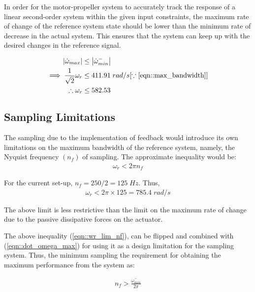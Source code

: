 
In order for the motor-propeller system to accurately track the response of a linear second-order system within the given input constraints, the maximum rate of change of the reference system state should be lower than the minimum rate of decrease in the actual system. This ensures that the system can keep up with the desired changes in the reference signal.

\begin{align}
    \left\lvert \dot \omega_{max} \right\rvert &\leq \left\lvert \dot \omega^{-}_{min} \right\rvert \label{eqn::dot_omega_max}\\
    \implies \frac{1}{\sqrt{2}} \omega_r &\leq 411.91 \; rad/s
    [\because \ref{eqn::max_bandwidth}]\\
    \therefore \omega_r &\leq 582.53
    \label{eqn::omega_r_lim}
\end{align}


\subsection{Sampling Limitations}
The sampling due to the implementation of feedback would introduce its own
limitations on the maximum bandwidth of the reference system, namely, the
Nyquist frequency $(n_f)$ of sampling. The approximate inequality would be:
\begin{align}
    \omega_r < 2 \pi n_f
    \label{eqn::wr_lim_nf}
\end{align}

For the current set-up, $n_f = 250/2 = 125 \; Hz$. Thus,
\begin{align}
    \omega_r < 2\pi \times 125 = 785.4 \; rad/s
\end{align}

The above limit is less restrictive than the limit on the maximum rate of change
due to the passive dissipative forces on the actuator.


\bigskip {} The above inequality (\ref{eqn::wr_lim_nf}), can be
flipped and combined with (\ref{eqn::dot_omega_max}) for using it as a design
limitation for the sampling system. Thus, the minimum sampling the requirement
for obtaining the maximum performance from the system as:

\begin{align}
    n_f > \frac{\dot \omega^{-}_{min}}{2 \pi}
\end{align}


